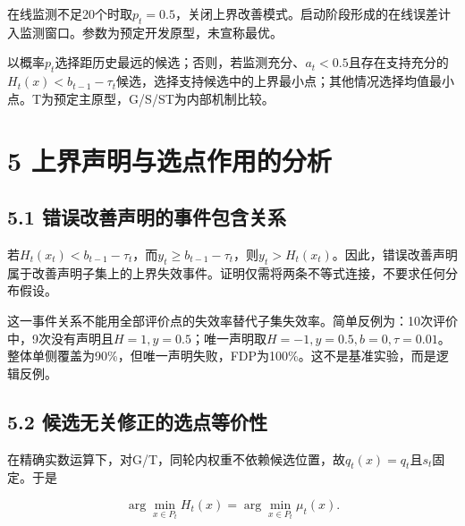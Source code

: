 \documentclass[11pt,a4paper]{article}
\begin{document}
在线监测不足20个时取\(p_t=0.5\)，关闭上界改善模式。启动阶段形成的在线误差计入监测窗口。参数为预定开发原型，未宣称最优。

以概率\(p_t\)选择距历史最远的候选；否则，若监测充分、\(a_t<0.5\)且存在支持充分的\(H_t(x)<b_{t-1}-\tau_t\)候选，选择支持候选中的上界最小点；其他情况选择均值最小点。T为预定主原型，G/S/ST为内部机制比较。

\hypertarget{ux4e0aux754cux58f0ux660eux4e0eux9009ux70b9ux4f5cux7528ux7684ux5206ux6790}{%
\section{5
上界声明与选点作用的分析}\label{ux4e0aux754cux58f0ux660eux4e0eux9009ux70b9ux4f5cux7528ux7684ux5206ux6790}}

\hypertarget{ux9519ux8befux6539ux5584ux58f0ux660eux7684ux4e8bux4ef6ux5305ux542bux5173ux7cfb}{%
\subsection{5.1
错误改善声明的事件包含关系}\label{ux9519ux8befux6539ux5584ux58f0ux660eux7684ux4e8bux4ef6ux5305ux542bux5173ux7cfb}}

若\(H_t(x_t)<b_{t-1}-\tau_t\)，而\(y_t\ge b_{t-1}-\tau_t\)，则\(y_t>H_t(x_t)\)。因此，错误改善声明属于改善声明子集上的上界失效事件。证明仅需将两条不等式连接，不要求任何分布假设。

这一事件关系不能用全部评价点的失效率替代子集失效率。简单反例为：10次评价中，9次没有声明且\(H=1,y=0.5\)；唯一声明取\(H=-1,y=0.5,b=0,\tau=0.01\)。整体单侧覆盖为90\%，但唯一声明失败，FDP为100\%。这不是基准实验，而是逻辑反例。

\par{}\noindent\begin{minipage}{\linewidth}

\hypertarget{ux5019ux9009ux65e0ux5173ux4feeux6b63ux7684ux9009ux70b9ux7b49ux4ef7ux6027}{%
\subsection{5.2
候选无关修正的选点等价性}\label{ux5019ux9009ux65e0ux5173ux4feeux6b63ux7684ux9009ux70b9ux7b49ux4ef7ux6027}}

在精确实数运算下，对G/T，同轮内权重不依赖候选位置，故\(q_t(x)=q_t\)且\(s_t\)固定。于是

\[
\arg\min_{x\in P_t} H_t(x)=\arg\min_{x\in P_t}\mu_t(x).
\]

\end{minipage}\par
\end{document}
